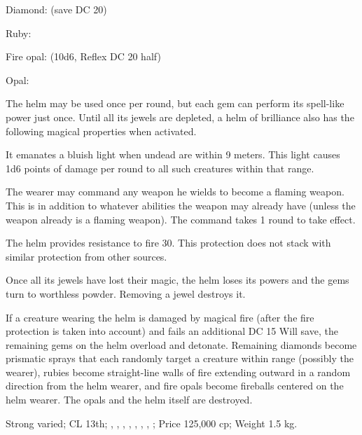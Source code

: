 \begin{itemize*}
\item Diamond:  (save DC 20)
\item Ruby: 
\item Fire opal:  (10d6, Reflex DC 20 half)
\item Opal: 
\end{itemize*}

The helm may be used once per round, but each gem can perform its spell-like power just once. Until all its jewels are depleted, a helm of brilliance also has the following magical properties when activated.

\begin{itemize*}
\item It emanates a bluish light when undead are within 9 meters. This light causes 1d6 points of damage per round to all such creatures within that range.
\item The wearer may command any weapon he wields to become a flaming weapon. This is in addition to whatever abilities the weapon may already have (unless the weapon already is a flaming weapon). The command takes 1 round to take effect.
\item The helm provides resistance to fire 30. This protection does not stack with similar protection from other sources.
\item Once all its jewels have lost their magic, the helm loses its powers and the gems turn to worthless powder. Removing a jewel destroys it.
\end{itemize*}

If a creature wearing the helm is damaged by magical fire (after the fire protection is taken into account) and fails an additional DC 15 Will save, the remaining gems on the helm overload and detonate. Remaining diamonds become prismatic sprays that each randomly target a creature within range (possibly the wearer), rubies become straight-line walls of fire extending outward in a random direction from the helm wearer, and fire opals become fireballs centered on the helm wearer. The opals and the helm itself are destroyed.

Strong varied; CL 13th; , , , , , , , ; Price 125,000 cp; Weight 1.5 kg.


